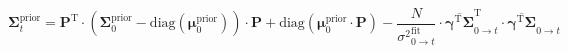 \documentclass[pdflatex,sn-mathphys-num]{sn-jnl}%
\theoremstyle{thmstyleone}%
\theoremstyle{thmstyletwo}%
\theoremstyle{thmstylethree}%
\begin{document}
\begin{equation}
	\boldsymbol{\Sigma}^{\mathrm{prior}}_{t} = 
	\boldsymbol{P}^{\mathrm{T}} \cdot \left( \boldsymbol{\Sigma}^{\mathrm{prior}}_{0} - \mathrm{diag}(\boldsymbol{\mu}^{\mathrm{prior}}_{0}) \right) \cdot \boldsymbol{P}
	+ \mathrm{diag}(\boldsymbol{\mu}^{\mathrm{prior}}_{0} \cdot \boldsymbol{P}) 
	- \frac{N}{{\sigma^2}^{\mathrm{fit}}_{0 \rightarrow t}} \cdot
	\overline{\boldsymbol{\gamma}^{\mathrm{T}} \boldsymbol{\Sigma}}_{0 \rightarrow t}^{\mathrm{T}} \cdot \overline{\boldsymbol{\gamma}^{\mathrm{T}} \boldsymbol{\Sigma}}_{0 \rightarrow t}
	\label{eq:prior_covariance_update_0_t}
\end{equation}
\end{document}
